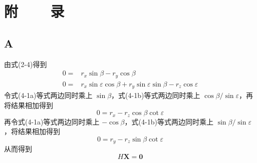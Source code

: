 %
%
%
%
%
%

\chapter*{\vskip 10bp \textmd{附~~~~录} \vskip -6bp}

\section*{A}
由式(2-4)得到
\begin{subequations}
	\begin{align}
		0=& r_x\sin\beta - r_y\cos\beta \\
		0=& r_x\sin\varepsilon\cos\beta+r_y\sin\varepsilon\sin\beta -r_z \cos\varepsilon
	\end{align}
\end{subequations}
令式(4-1a)等式两边同时乘上 $\sin\beta$，式(4-1b)等式两边同时乘上 $\cos\beta/\sin\varepsilon$，再将结果相加得到
\begin{equation}
	0=r_x - r_z \cos\beta\cot\varepsilon
\end{equation}
再令式(4-1a)等式两边同时乘上 $-\cos\beta$，式(4-1b)等式两边同时乘上 $\sin\beta/\sin\varepsilon$，将结果相加得到
\begin{equation}
	0=r_y - r_z\sin\beta\cot\varepsilon
\end{equation}
从而得到
\begin{equation}
	H \bm{X} = \bm{0}
\end{equation}

